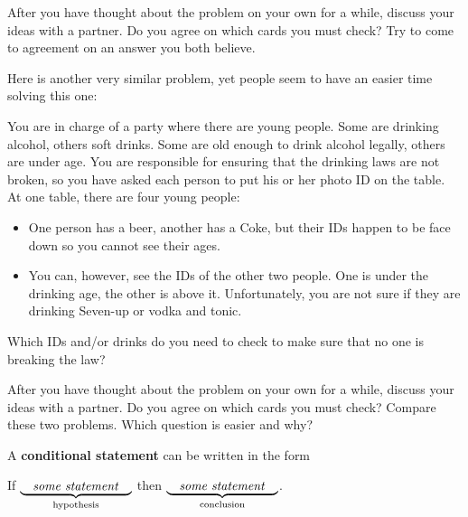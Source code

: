 

\begin{thinkpair*}
After you have thought about the problem on your own for a while, discuss your ideas with a partner.  Do you agree on which cards you must check?   Try to come to agreement on an answer you both believe.
\end{thinkpair*}

Here is another very similar problem, yet people seem to have an easier time solving this one:


\begin{problem}
You are in charge of a party where there are young people. Some are drinking alcohol, others soft
drinks. Some are old enough to drink alcohol legally, others are under age. You are responsible for
ensuring that the drinking laws are not broken, so you have asked each person to put his or her
photo ID on the table. At one table, there are four young people:
\begin{itemize}
\item
One person has a beer, another has a
Coke, but their IDs happen to be face down so you cannot see their ages. 
\item
You can, however, see the
IDs of the other two people. One is under the drinking age, the other is above it. Unfortunately,
you are not sure if they are drinking Seven-up or vodka and tonic. 
\end{itemize}
Which IDs and/or drinks do you
need to check to make sure that no one is breaking the law?
\end{problem}

\begin{thinkpair*}
After you have thought about the problem on your own for a while, discuss your ideas with a partner.  Do you agree on which cards you must check?   Compare these two problems.
Which question is easier and why?
\end{thinkpair*}

\begin{define}
A {\bf conditional statement} can be written in the form
\begin{center}
If $\underbrace{\quad \text{\emph{some statement}} \quad}_{\text{hypothesis}}$ then $\underbrace{\quad \text{\emph{some statement}}  \quad}_{\text{conclusion}}$.
\end{center}
\end{define}

